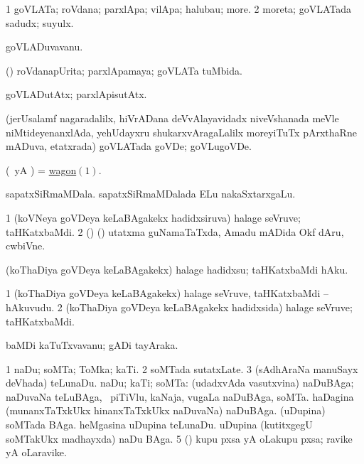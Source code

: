 \bentry
{} 
\gl{\nA}
\expl{}
\bmng
\bnum
\num{1} goVLATa; roVdana; parxlApa; vilApa; halubau; more. 
\num{2} moreta; goVLATada sadudx; suyulx. 
\enum
\emng
\eentry

\bentry
{} 
\gl{\nA}
\bmng
goVLADuvavanu. 
\emng
\eentry

\bentry
{} 
\gl{\gu}
\expl{}
\bmng
(\kAparx) roVdanapUrita; parxlApamaya; goVLATa tuMbida. 
\emng
\eentry

\bentry
{} 
\gl{\kirxvi}
\expl{}
\bmng
goVLADutAtx; parxlApisutAtx. 
\emng
\eentry

\bentry
{} 
\gl{\nA}
\expl{}
\bmng
(jerUsalamf nagaradalilx, hiVrADana deVvAlayavidadx niveVshanada meVle niMtideyenanxlAda, yehUdayxru shukarxvAragaLalilx moreyiTuTx pArxthaRne mADuva, etatxrada) goVLATada goVDe; goVLugoVDe. 
\emng
\eentry

\bentry
{} 
\gl{\nA}
\expl{}
\bmng
(\kAparx\ yA \pArxM) = \hyperlink{wagon(1)}{wagon\((1)\)}. 
\emng

\noindent 
\gl{\pagu}
\expl{}
\bmng
{} 
\banum
{} sapatxSiRmaMDala. 
 sapatxSiRmaMDalada ELu nakaSxtarxgaLu. 
\eanum
\emng
\eentry

\bentry
{} 
\gl{\nA}
\expl{}
\bmng
\bnum
\num{1} (koVNeya goVDeya keLaBAgakekx hadidxsiruva) halage seVruve; taHKatxbaMdi. 
\num{2} (\ca) (\birx) utatxma guNamaTaTxda, Amadu mADida Okf dAru, cwbiVne. 
\enum
\emng
\eentry

\bentry
{} 
\gl{\sakirx}
\bmng
(koThaDiya goVDeya keLaBAgakekx) halage hadidxsu; taHKatxbaMdi hAku. 
\emng
\eentry

\bentry
{} 
\gl{\nA}
\expl{}
\bmng
\bnum
\num{1} (koThaDiya goVDeya keLaBAgakekx) halage seVruve, taHKatxbaMdi -- hAkuvudu. 
\num{2} (koThaDiya goVDeya keLaBAgakekx hadidxsida) halage seVruve; taHKatxbaMdi. 
\enum
\emng
\eentry

\bentry
{} 
\gl{\nA}
\expl{}
\bmng
baMDi kaTuTxvavanu; gADi tayAraka. 
\emng
\eentry

\bentry
{} 
\gl{\nA}
\bmng
\bnum
\num{1} naDu; soMTa; ToMka; kaTi. 
\num{2} soMTada sutatxLate. 
\num{3} (sAdhAraNa manuSayx deVhada) teLunaDu. 
 naDu; kaTi; soMTa: 
\banum
{} (udadxvAda vasutxvina) naDuBAga; naDuvaNa teLuBAga, \udA\ piTiVlu, kaNaja, \mo vugaLa naDuBAga, soMTa. 
 haDagina (munanxTaTxkUkx hinanxTaTxkUkx naDuvaNa) naDuBAga. 
 (uDupina) soMTada BAga. 
 heMgasina uDupina teLunaDu. 
 uDupina (kutitxgegU soMTakUkx madhayxda) naDu BAga. 
\eanum
\numie
\num{5} (\ame) kupu pxsa yA oLakupu pxsa; ravike yA oLaravike. 
\enum
\emng
\eentry

